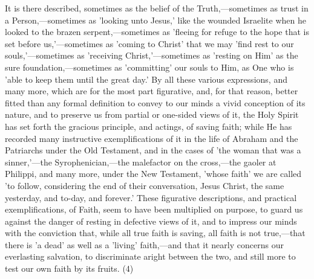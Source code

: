 \documentclass[
]{book}
\begin{document}
It is there described, sometimes as the belief of the Truth,---sometimes as trust in a Person,---sometimes as 'looking unto Jesus,' like the wounded Israelite when he looked to the brazen serpent,---sometimes as 'fleeing for refuge to the hope that is set before us,'---sometimes as 'coming to Christ' that we may 'find rest to our souls,'---sometimes as 'receiving Christ,'---sometimes as 'resting on Him' as the sure foundation,---sometimes as 'committing' our souls to Him, as One who is 'able to keep them until the great day.' By all these various expressions, and many more, which are for the most part figurative, and, for that reason, better fitted than any formal definition to convey to our minds a vivid conception of its nature, and to preserve us from partial or one-sided views of it, the Holy Spirit has set forth the gracious principle, and actings, of saving faith; while He has recorded many instructive exemplifications of it in the life of Abraham and the Patriarchs under the Old Testament, and in the cases of 'the woman that was a sinner,'---the Syrophenician,---the malefactor on the cross,---the gaoler at Philippi, and many more, under the New Testament, 'whose faith' we are called 'to follow, considering the end of their conversation, Jesus Christ, the same yesterday, and to-day, and forever.' These figurative descriptions, and practical exemplifications, of Faith, seem to have been multiplied on purpose, to guard us against the danger of resting in defective views of it, and to impress our minds with the conviction that, while all true faith is saving, all faith is not true,---that there is 'a dead' as well as a 'living' faith,---and that it nearly concerns our everlasting salvation, to discriminate aright between the two, and still more to test our own faith by its fruits. (4)
\end{document}
